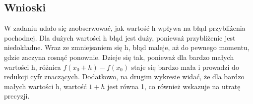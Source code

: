 \documentclass{article}
\begin{document}
\subsection{Wnioski}
W zadaniu udało się zaobserwować, jak wartość h wpływa na błąd przybliżenia pochodnej. Dla dużych wartości h błąd jest duży, ponieważ przybliżenie jest niedokładne. Wraz ze zmniejsaniem się h, błąd maleje, aż do pewnego momentu, gdzie zaczyna rosnąć ponownie. Dzieje się tak, ponieważ dla bardzo małych wartości h, różnica $f(x_{0}+h)-f(x_{0})$ staje się bardzo mała i prowadzi do redukcji cyfr znaczących. Dodatkowo, na drugim wykresie widać, że dla bardzo małych wartości h, wartość $1 + h$ jest równa 1, co również wskazuje na utratę precyzji.
\end{document}
